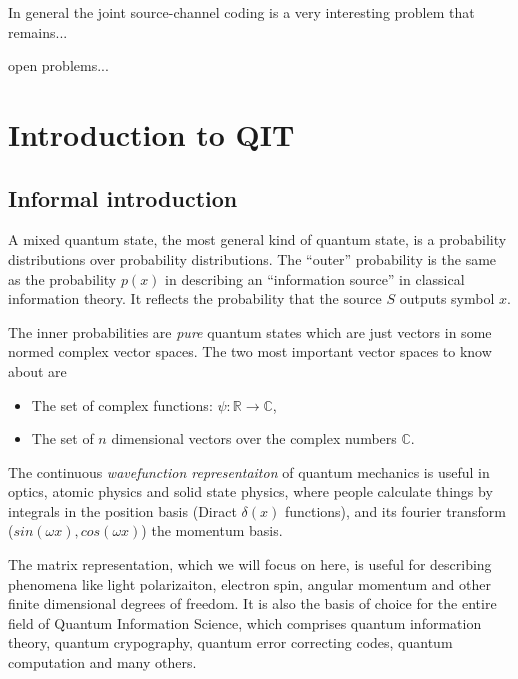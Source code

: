 \documentclass[aps,11pt,twoside,letterpaper]{article}
\def\c{\mathbb{C}}
\begin{document}
        
        In general the joint source-channel coding 
        is a very interesting problem that remains...



        open problems...





\appendix


\section{Introduction to QIT}           \label{section:intro_to_qit}


    \subsection{Informal introduction}

        A mixed quantum state, the most general kind of quantum state, is a
        probability distributions over probability distributions.
        The ``outer'' probability is the same as the probability $p(x)$ in describing 
        an ``information source'' in classical information theory.
        It reflects the probability that the source $S$ outputs symbol $x$.

        The inner probabilities are \emph{pure} quantum states 
        which are just vectors in some normed complex vector spaces.
        The two most important vector spaces to know about are  
        \begin{itemize}
            \item   The set of complex functions: $\psi \colon \mathbb{R} \to \mathbb{C} $,
            \item   The set of $n$ dimensional vectors over the complex numbers $\c$.
        \end{itemize}
        The continuous \emph{wavefunction representaiton} of quantum mechanics is useful in optics,
        atomic physics and solid state physics, where people calculate things by integrals in 
        the position basis (Diract $\delta(x)$ functions),
        and its fourier transform ($sin(\omega x),cos(\omega x)$) the momentum basis.

        The matrix representation, which we will focus on here,  is useful for describing 
        phenomena like light polarizaiton, electron spin, angular momentum and other 
        finite dimensional degrees of freedom.
        It is also the basis of choice for the entire field of Quantum Information Science,
        which comprises quantum information theory, quantum crypography, quantum error correcting codes, 
        quantum computation and many others.
\end{document}

